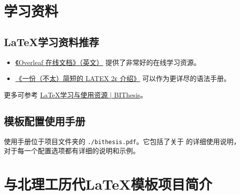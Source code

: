 \begin{appendices}
  \chapter{学习资料} \label{resources}

  \section{\LaTeX 学习资料推荐}
  \begin{itemize}[nosep]
    \item \href{https://www.overleaf.com/learn/latex/Tutorials}{《Overleaf 在线文档》（英文）} 提供了非常好的在线学习资源。
    \item \href{https://texdoc.org/serve/lshort-zh-cn.pdf/0}{《一份（不太）简短的 LATEX 2ε 介绍》} 可以作为更详尽的语法手册。
  \end{itemize}

  更多可参考 \href{https://bithesis.bitnp.net/guide/resources.html}{\LaTeX 学习与使用资源 | BIThesis}。

  \section{\BIThesis 模板配置使用手册}
  \BIThesis{} 使用手册位于项目文件夹的 \verb|./bithesis.pdf|。它包括了关于 \BIThesis{} 的详细使用说明，
      对于每一个配置选项都有详细的说明和示例。

  \chapter{\BIThesis 与北理工历代\LaTeX{}模板项目简介}


\end{appendices}
